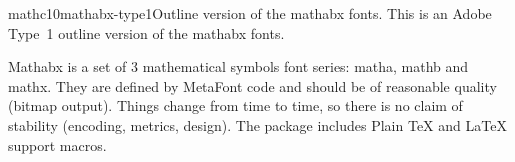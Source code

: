 \documentclass{ddltxtyp}
\begin{document}
\begin{package}{mathc10}{mathabx-type1}{Outline version of the mathabx fonts.}
This is an Adobe Type~1 outline version of the mathabx fonts.

Mathabx is a set of 3 mathematical symbols font series: matha,
mathb and mathx. They are defined by MetaFont code and should
be of reasonable quality (bitmap output). Things change from
time to time, so there is no claim of stability (encoding,
metrics, design). The package includes Plain {\TeX} and {\LaTeX}
support macros.
\end{package}
\end{document}
